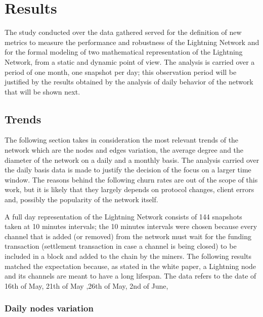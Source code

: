 
	\chapter{Results}
	
	The study conducted over the data gathered served for the definition of new metrics to measure the performance and robustness of the Lightning Network and for the formal modeling of two mathematical representation of the Lightning Network, from a static and dynamic point of view. The analysis is carried over a period of one month, one snapshot per day; this observation period will be justified by the results obtained by the analysis of daily behavior of the network that will be shown next. 
	
	\section{Trends}
	
	The following section takes in consideration the most relevant trends of the network which are the nodes and edges variation, the average degree and the diameter of the network on a daily and a monthly basis. The analysis carried over the daily basis data is made to justify the decision of the focus on a larger time window. The reasons behind the following churn rates are out of the scope of this work, but it is likely that they largely depends on protocol changes, client errors and, possibly the popularity of the network itself.
	
	A full day representation of the Lightning Network consists of 144 snapshots taken at 10 minutes intervals; the 10 minutes intervals were chosen because every channel that is added (or removed) from the network must wait for the funding transaction (settlement transaction in case a channel is being closed) to be included in a block and added to the chain by the miners. The following results matched the expectation because, as stated in the white paper, a Lightning node and its channels are meant to have a long lifespan. The data refers to the date of 16th of May, 21th of May ,26th of May, 2nd of June, 
	
	\subsection{Daily nodes variation}
	
